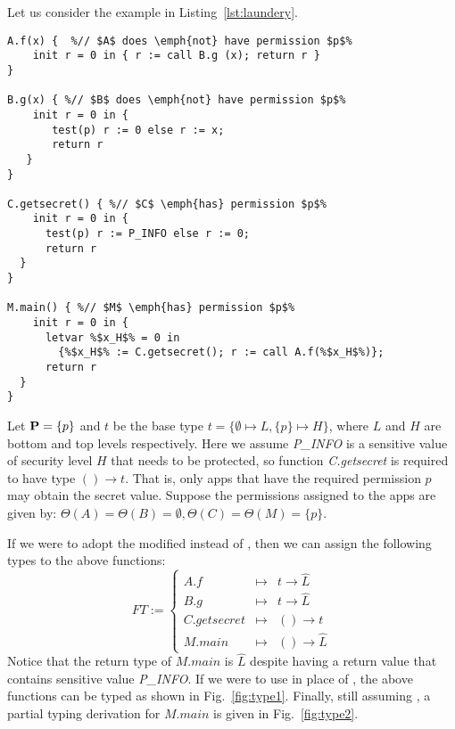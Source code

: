 {{{Let us consider the example in Listing~\ref{lst:laundery}.
\begin{lstlisting}[float=tp, label={lst:laundery}, caption={An example illustrating the parameter laundering issue.}]
A.f(x) {  %// $A$ does \emph{not} have permission $p$%
	init r = 0 in { r := call B.g (x); return r }
}
	
B.g(x) { %// $B$ does \emph{not} have permission $p$%
	init r = 0 in {
	   test(p) r := 0 else r := x;
	   return r 
   }
}

C.getsecret() { %// $C$ \emph{has} permission $p$%
	init r = 0 in {
	  test(p) r := P_INFO else r := 0;
	  return r 
  }
}

M.main() { %// $M$ \emph{has} permission $p$%
    init r = 0 in {
	  letvar %$x_H$% = 0 in
	  	{%$x_H$% := C.getsecret(); r := call A.f(%$x_H$%)};
      return r
  }
}
\end{lstlisting}
Let $\mathbf{P}=\{p\}$ and $t$ be the base type $t =  \{\emptyset \mapsto L, \{p\} \mapsto H\}$,
where $L$ and $H$ are bottom and top levels respectively. Here we assume \textit{P\_INFO} is a sensitive value
of security level $H$ that needs to be protected, so function \textit{C.getsecret} is required to have type $() \rightarrow t$. That is, only apps that have the required permission $p$ may obtain
the secret value.
Suppose the permissions assigned to the apps are given by:  $\Theta(A) =  \Theta(B) = \emptyset, \Theta(C) = \Theta(M) = \{p\}.$

If we were to adopt the modified  instead of , then we can assign the following
types to the above functions:
\[
FT := \left\{
\begin{array}{lcl}
A.f & \mapsto & t \rightarrow \hat{L} \\
B.g & \mapsto & t \rightarrow \hat{L}\\
C.getsecret & \mapsto & () \rightarrow t\\
M.main & \mapsto  & () \rightarrow \hat{L}
\end{array}
\right.
\]
Notice that the return type of $M.main$ is $\hat{L}$ despite having a
return value that contains sensitive value \textit{P\_INFO}.
If we were to use  in place of , the above functions can
be typed as shown in Fig.~\ref{fig:type1}.
Finally, still assuming , a partial typing
derivation for $M.main$ is given in Fig.~\ref{fig:type2}.

}}}
